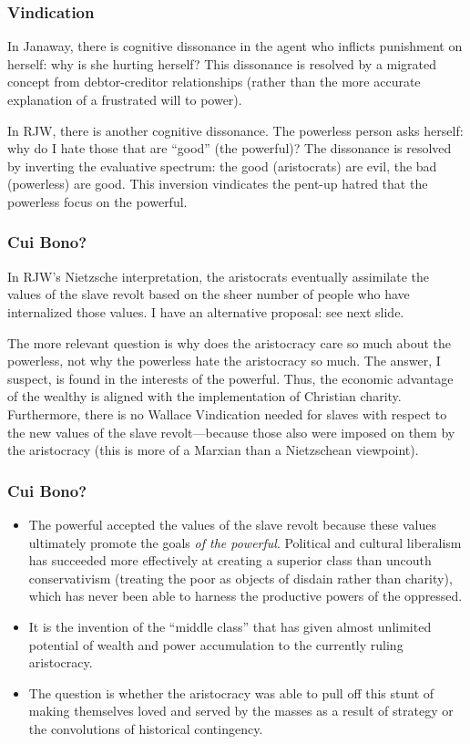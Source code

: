 \documentclass[xcolor=dvipsnames]{beamer}
\begin{document}
\begin{frame}
  \frametitle{Vindication}
  In Janaway, there is cognitive dissonance in the agent who inflicts
  punishment on herself: why is she hurting herself? This dissonance
  is resolved by a migrated concept from debtor-creditor
  relationships (rather than the more accurate explanation of a
  frustrated will to power).

  \bigskip

  In RJW, there is another cognitive dissonance. The powerless person
  asks herself: why do I hate those that are ``good'' (the powerful)?
  The dissonance is resolved by inverting the evaluative spectrum: the
  good (aristocrats) are evil, the bad (powerless) are good. This
  inversion vindicates the pent-up hatred that the powerless focus on
  the powerful.
\end{frame}

\begin{frame}
  \frametitle{Cui Bono?}
  In RJW's Nietzsche interpretation, the aristocrats eventually
  assimilate the values of the slave revolt based on the sheer number
  of people who have internalized those values. I have an alternative
  proposal: see next slide.

  \bigskip

  The more relevant question is why does the aristocracy care so much
  about the powerless, not why the powerless hate the aristocracy so
  much. The answer, I suspect, is found in the interests of the
  powerful. Thus, the economic advantage of the wealthy is aligned
  with the implementation of Christian charity. Furthermore, there is
  no Wallace Vindication needed for slaves with respect to the new
  values of the slave revolt---because those also were imposed on them
  by the aristocracy (this is more of a Marxian than a Nietzschean
  viewpoint). 
\end{frame}

\begin{frame}
  \frametitle{Cui Bono?}
  \begin{itemize}
  \item The powerful accepted the values of the slave revolt because
    these values ultimately promote the goals \emph{of the powerful}.
    Political and cultural liberalism has succeeded more effectively
    at creating a superior class than uncouth conservativism (treating
    the poor as objects of disdain rather than charity), which has
    never been able to harness the productive powers of the oppressed.
\item It is the invention of the ``middle class'' that has given
  almost unlimited potential of wealth and power accumulation to the
  currently ruling aristocracy.
\item The question is whether the aristocracy was able to pull off
  this stunt of making themselves loved and served by the masses as a
  result of strategy or the convolutions of historical contingency.
\end{itemize}
\end{frame}
\end{document}
